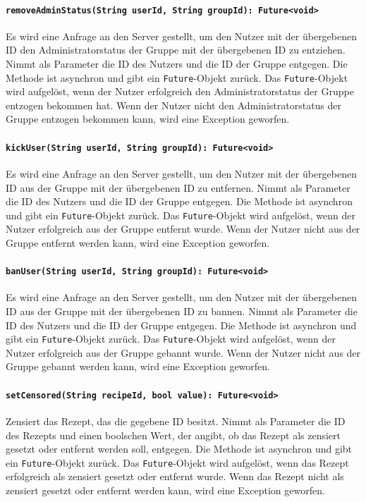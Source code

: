 \documentclass{entwurfsheft}
\begin{document}
\paragraph{\texttt{removeAdminStatus(String userId, String groupId): Future<void>}}
Es wird eine Anfrage an den Server gestellt, um den Nutzer mit der übergebenen ID den Administratorstatus der Gruppe mit der übergebenen ID zu entziehen. Nimmt als Parameter die ID des Nutzers und die ID der Gruppe entgegen. Die Methode ist asynchron und gibt ein \texttt{Future}-Objekt zurück. Das \texttt{Future}-Objekt wird aufgelöst, wenn der Nutzer erfolgreich den Administratorstatus der Gruppe entzogen bekommen hat. Wenn der Nutzer nicht den Administratorstatus der Gruppe entzogen bekommen kann, wird eine Exception geworfen.
\paragraph{\texttt{kickUser(String userId, String groupId): Future<void>}}
Es wird eine Anfrage an den Server gestellt, um den Nutzer mit der übergebenen ID aus der Gruppe mit der übergebenen ID zu entfernen. Nimmt als Parameter die ID des Nutzers und die ID der Gruppe entgegen. Die Methode ist asynchron und gibt ein \texttt{Future}-Objekt zurück. Das \texttt{Future}-Objekt wird aufgelöst, wenn der Nutzer erfolgreich aus der Gruppe entfernt wurde. Wenn der Nutzer nicht aus der Gruppe entfernt werden kann, wird eine Exception geworfen.
\paragraph{\texttt{banUser(String userId, String groupId): Future<void>}}
Es wird eine Anfrage an den Server gestellt, um den Nutzer mit der übergebenen ID aus der Gruppe mit der übergebenen ID zu bannen. Nimmt als Parameter die ID des Nutzers und die ID der Gruppe entgegen. Die Methode ist asynchron und gibt ein \texttt{Future}-Objekt zurück. Das \texttt{Future}-Objekt wird aufgelöst, wenn der Nutzer erfolgreich aus der Gruppe gebannt wurde. Wenn der Nutzer nicht aus der Gruppe gebannt werden kann, wird eine Exception geworfen.
\paragraph{\texttt{setCensored(String recipeId, bool value): Future<void>}}
Zensiert das Rezept, das die gegebene ID besitzt. Nimmt als Parameter die ID des Rezepts und einen boolschen Wert, der angibt, ob das Rezept als zensiert gesetzt oder entfernt werden soll, entgegen. Die Methode ist asynchron und gibt ein \texttt{Future}-Objekt zurück. Das \texttt{Future}-Objekt wird aufgelöst, wenn das Rezept erfolgreich als zensiert gesetzt oder entfernt wurde. Wenn das Rezept nicht als zensiert gesetzt oder entfernt werden kann, wird eine Exception geworfen.
\newpage
\end{document}
